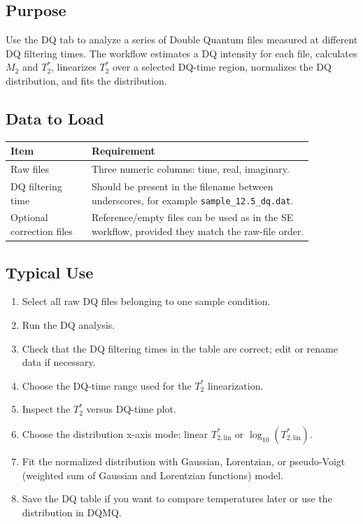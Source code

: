 \documentclass[11pt,a4paper]{article}
\newcommand{\TtwoStar}{\ensuremath{T_2^{\ast}}}
\newcommand{\Mtwo}{\ensuremath{M_2}}
\newcommand{\TtwoStarLin}{\ensuremath{T_{2,\mathrm{lin}}^{\ast}}}
\begin{document}
\subsection{Purpose}
Use the DQ tab to analyze a series of Double Quantum files measured at different DQ filtering times. The workflow estimates a DQ intensity for each file, calculates \Mtwo{} and \TtwoStar{}, linearizes \TtwoStar{} over a selected DQ-time region, normalizes the DQ distribution, and fits the distribution.

\subsection{Data to Load}
\begin{longtable}{p{0.23\linewidth}p{0.63\linewidth}}
\toprule
Item & Requirement \\
\midrule
Raw files & Three numeric columns: time, real, imaginary. \\
DQ filtering time & Should be present in the filename between underscores, for example \texttt{sample\_12.5\_dq.dat}. \\
Optional correction files & Reference/empty files can be used as in the SE workflow, provided they match the raw-file order. \\
\bottomrule
\end{longtable}

\subsection{Typical Use}
\begin{enumerate}
  \item Select all raw DQ files belonging to one sample condition.
  \item Run the DQ analysis.
  \item Check that the DQ filtering times in the table are correct; edit or rename data if necessary.
  \item Choose the DQ-time range used for the \TtwoStar{} linearization.
  \item Inspect the \TtwoStar{} versus DQ-time plot.
  \item Choose the distribution x-axis mode: linear \TtwoStarLin{} or \(\log_{10}(\TtwoStarLin)\).
  \item Fit the normalized distribution with Gaussian, Lorentzian, or pseudo-Voigt (weighted sum of Gaussian and Lorentzian functions) model.
  \item Save the DQ table if you want to compare temperatures later or use the distribution in DQMQ.
\end{enumerate}
\end{document}
